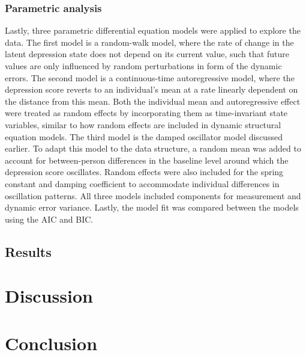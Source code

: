 \documentclass[man, floatsintext]{apa7}
\begin{document}
\subsubsection{Parametric analysis}

Lastly, three parametric differential equation models were applied to explore
the data. The first model is a random-walk model, where the rate of change in
the latent depression state does not depend on its current value, such that
future values are only influenced by random perturbations in form of the
dynamic errors.
The second model is a continuous-time autoregressive model, where the
depression score reverts to an individual's mean at a rate linearly dependent
on the distance from this mean. Both the individual mean and autoregressive
effect were treated as random effects by incorporating them as time-invariant
state variables, similar to how random effects are included
in dynamic structural equation models.
The third model is the damped oscillator model discussed earlier. To adapt this
model to the data structure, a random mean was added to account for
between-person differences in the baseline level around which the depression
score oscillates. Random effects were also included for the spring constant
and damping coefficient to accommodate individual differences in oscillation
patterns. All three models included components for measurement and dynamic
error variance. Lastly, the model fit was compared between the models
using the AIC and BIC.

\subsection{Results}

\section{Discussion}

\section{Conclusion}

\printbibliography[]
\end{document}
